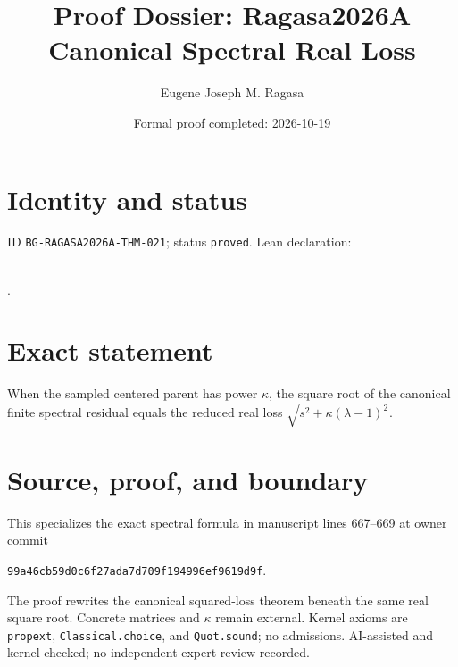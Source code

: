 \documentclass[11pt]{article}
\title{Proof Dossier: Ragasa2026A Canonical Spectral Real Loss}\author{Eugene Joseph M. Ragasa}\date{Formal proof completed: 2026-10-19}
\begin{document}
\maketitle
\section{Identity and status}
ID \texttt{BG-RAGASA2026A-THM-021}; status \texttt{proved}. Lean declaration:
\par{}\\
{\tiny{}}.
\section{Exact statement}
When the sampled centered parent has power $\kappa$, the square root of the canonical
finite spectral residual equals the reduced real loss
$\sqrt{s^2+\kappa(\lambda-1)^2}$.
\section{Source, proof, and boundary}
This specializes the exact spectral formula in manuscript lines 667--669 at owner commit
\begin{center}\small\texttt{99a46cb59d0c6f27ada7d709f194996ef9619d9f}.\end{center}
The proof rewrites the canonical squared-loss theorem beneath the same real square root.
Concrete matrices and $\kappa$ remain external. Kernel axioms are \texttt{propext},
\texttt{Classical.choice}, and \texttt{Quot.sound}; no admissions. AI-assisted and
kernel-checked; no independent expert review recorded.
\end{document}

